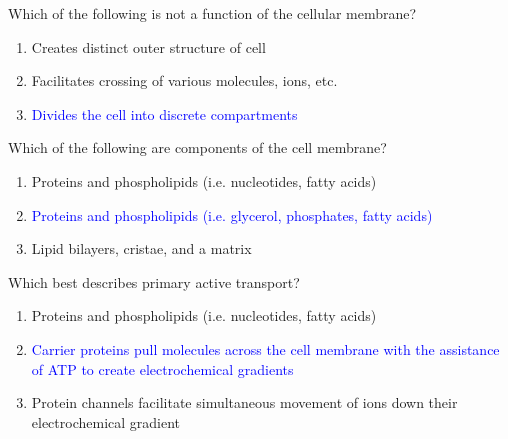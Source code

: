 \documentclass[11pt,fleqn]{book} %
\begin{document}
\begin{descriptions}
\begin{center}
\end{center}
\begin{exercise}
    Which of the following is not a function of the cellular membrane?
    \begin{enumerate}
        \item Creates distinct outer structure of cell
        \item Facilitates crossing of various molecules, ions, etc.
        \item \textcolor{blue}{Divides the cell into discrete compartments}
    \end{enumerate}
\end{exercise}
\begin{exercise}
    Which of the following are components of the cell membrane?
    \begin{enumerate}
        \item Proteins and phospholipids (i.e. nucleotides, fatty acids)
        \item \textcolor{blue}{Proteins and phospholipids (i.e. glycerol, phosphates, fatty acids)}
        \item Lipid bilayers, cristae, and a matrix
    \end{enumerate}
\end{exercise}
\begin{exercise}
    Which best describes primary active transport?
    \begin{enumerate}
        \item Proteins and phospholipids (i.e. nucleotides, fatty acids)
        \item \textcolor{blue}{Carrier proteins pull molecules across the cell membrane with the assistance of ATP to create electrochemical gradients}
        \item Protein channels facilitate simultaneous movement of ions down their electrochemical gradient
    \end{enumerate}
\end{exercise}
\end{descriptions}
\end{document}

